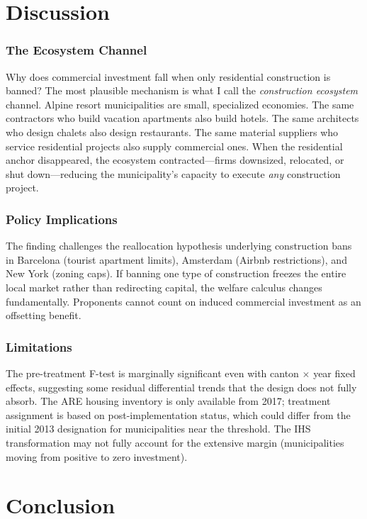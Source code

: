 \documentclass[12pt]{article}
\begin{document}
\section{Discussion}

\subsubsection*{The Ecosystem Channel} Why does commercial investment fall when only residential construction is banned? The most plausible mechanism is what I call the \textit{construction ecosystem} channel. Alpine resort municipalities are small, specialized economies. The same contractors who build vacation apartments also build hotels. The same architects who design chalets also design restaurants. The same material suppliers who service residential projects also supply commercial ones. When the residential anchor disappeared, the ecosystem contracted---firms downsized, relocated, or shut down---reducing the municipality's capacity to execute \textit{any} construction project.

\subsubsection*{Policy Implications} The finding challenges the reallocation hypothesis underlying construction bans in Barcelona (tourist apartment limits), Amsterdam (Airbnb restrictions), and New York (zoning caps). If banning one type of construction freezes the entire local market rather than redirecting capital, the welfare calculus changes fundamentally. Proponents cannot count on induced commercial investment as an offsetting benefit.

\subsubsection*{Limitations} The pre-treatment F-test is marginally significant even with canton $\times$ year fixed effects, suggesting some residual differential trends that the design does not fully absorb. The ARE housing inventory is only available from 2017; treatment assignment is based on post-implementation status, which could differ from the initial 2013 designation for municipalities near the threshold. The IHS transformation may not fully account for the extensive margin (municipalities moving from positive to zero investment).

\section{Conclusion}
\end{document}
